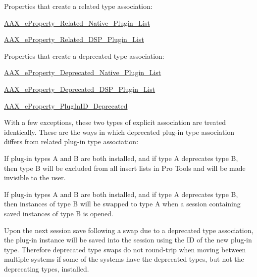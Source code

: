 Properties that create a related type association\+: 
\begin{DoxyItemize}
\item \hyperlink{a00283_a6571f4e41a5dd06e4067249228e2249eae47f50370ae2f6bf29b8cacc6a41d924}{A\+A\+X\+\_\+e\+Property\+\_\+\+Related\+\_\+\+Native\+\_\+\+Plugin\+\_\+\+List} 
\item \hyperlink{a00283_a6571f4e41a5dd06e4067249228e2249ea9dc35184d705e963f14f85df4d71193d}{A\+A\+X\+\_\+e\+Property\+\_\+\+Related\+\_\+\+D\+S\+P\+\_\+\+Plugin\+\_\+\+List} 
\end{DoxyItemize}

Properties that create a deprecated type association\+: 
\begin{DoxyItemize}
\item \hyperlink{a00283_a6571f4e41a5dd06e4067249228e2249ea3f1e690c987d601001a7cc1da8247399}{A\+A\+X\+\_\+e\+Property\+\_\+\+Deprecated\+\_\+\+Native\+\_\+\+Plugin\+\_\+\+List} 
\item \hyperlink{a00283_a6571f4e41a5dd06e4067249228e2249eab102bc794f2770c14b1f0fe2dde6766a}{A\+A\+X\+\_\+e\+Property\+\_\+\+Deprecated\+\_\+\+D\+S\+P\+\_\+\+Plugin\+\_\+\+List} 
\item \hyperlink{a00283_a6571f4e41a5dd06e4067249228e2249eadb254df9b6114516beed7a04675a22a3}{A\+A\+X\+\_\+e\+Property\+\_\+\+Plug\+In\+I\+D\+\_\+\+Deprecated} 
\end{DoxyItemize}

With a few exceptions, these two types of explicit association are treated identically. These are the ways in which deprecated plug-\/in type association differs from related plug-\/in type association\+: 
\begin{DoxyItemize}
\item If plug-\/in types A and B are both installed, and if type A deprecates type B, then type B will be excluded from all insert lists in Pro Tools and will be made invisible to the user. 
\item If plug-\/in types A and B are both installed, and if type A deprecates type B, then instances of type B will be swapped to type A when a session containing saved instances of type B is opened. 
\item Upon the next session save following a swap due to a deprecated type association, the plug-\/in instance will be saved into the session using the I\+D of the new plug-\/in type. Therefore deprecated type swaps do not round-\/trip when moving between multiple systems if some of the systems have the deprecated types, but not the deprecating types, installed. 
\end{DoxyItemize}

